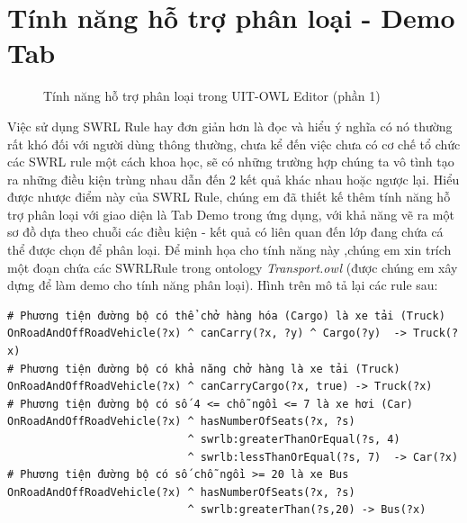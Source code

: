 \section{Tính năng hỗ trợ phân loại - Demo Tab}
\begin{figure}[ht!]
	\centering
	\caption{Tính năng hỗ trợ phân loại trong UIT-OWL Editor (phần 1)\label{overflow}}
\end{figure}
Việc sử dụng SWRL Rule hay đơn giản hơn là đọc và hiểu ý nghĩa có nó thường rất khó đối với người dùng thông thường, chưa kể đến việc chưa có cơ chế tổ chức các SWRL rule một cách khoa học, sẽ có những trường hợp chúng ta vô tình tạo ra những điều kiện trùng nhau dẫn đến 2 kết quả khác nhau hoặc ngược lại. Hiểu được nhược điểm này của SWRL Rule, chúng em đã thiết kế thêm tính năng hỗ trợ phân loại với giao diện là Tab Demo trong ứng dụng, với khả năng vẽ ra một sơ đồ dựa theo chuỗi các điều kiện - kết quả có liên quan đến lớp đang chứa cá thể được chọn để phân loại. Để minh họa cho tính năng này ,chúng em xin trích một đoạn chứa các SWRLRule trong ontology \textit{Transport.owl} \cite{owleditorSrc} (được chúng em xây dựng để làm demo cho tính năng phân loại). Hình trên mô tả lại các rule sau:
\begin{verbatim}
# Phương tiện đường bộ có thể chở hàng hóa (Cargo) là xe tải (Truck)
OnRoadAndOffRoadVehicle(?x) ^ canCarry(?x, ?y) ^ Cargo(?y)  -> Truck(?x)
# Phương tiện đường bộ có khả năng chở hàng là xe tải (Truck)
OnRoadAndOffRoadVehicle(?x) ^ canCarryCargo(?x, true) -> Truck(?x)
# Phương tiện đường bộ có số 4 <= chỗ ngồi <= 7 là xe hơi (Car)
OnRoadAndOffRoadVehicle(?x) ^ hasNumberOfSeats(?x, ?s)
                            ^ swrlb:greaterThanOrEqual(?s, 4) 
                            ^ swrlb:lessThanOrEqual(?s, 7)  -> Car(?x)
# Phương tiện đường bộ có số chỗ ngồi >= 20 là xe Bus 
OnRoadAndOffRoadVehicle(?x) ^ hasNumberOfSeats(?x, ?s) 
                            ^ swrlb:greaterThan(?s,20) -> Bus(?x)                               
\end{verbatim}
